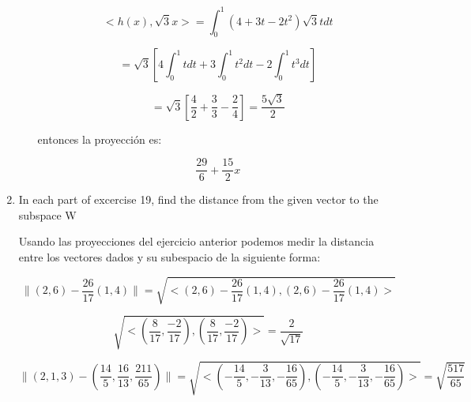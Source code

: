 \documentclass[12pt,a4paper]{article}
\providecommand{\norm}[1]{\lVert#1\rVert}
\begin{document}
\begin{enumerate}
\begin{enumerate}
        \begin{equation*}
            <h(x), \sqrt{3}x> = \int_{0}^{1} (4 +3t-2t^2)\sqrt{3}t dt 
        \end{equation*}
        
        \begin{equation*}
            = \sqrt{3} \left[ 4 \int_{0}^{1} t dt + 3 \int_{0}^{1} t^2 dt - 2 \int_{0}^{1} t^3 dt\right]
        \end{equation*}
        
        \begin{equation*}
            = \sqrt{3} \left[ \frac{4}{2} + \frac{3}{3} - \frac{2}{4}\right] = \frac{5 \sqrt{3}}{2}
        \end{equation*}
        
        entonces la proyección es:
        
        \begin{equation*}
            \frac{29}{6} + \frac{15}{2} x
        \end{equation*}
        
    \end{enumerate}

    
    
    
    
    
    
    \item In each part of excercise 19, find the distance from the given vector to the subspace W
    
    Usando las proyecciones del ejercicio anterior podemos medir la distancia entre los vectores dados y su subespacio de la siguiente forma:
    
    \begin{equation*}
        \norm{(2,6) - \frac{26}{17} (1,4)} =\sqrt{<(2,6) - \frac{26}{17}(1,4),(2,6) - \frac{26}{17}(1,4)>} 
    \end{equation*}
    
    \begin{equation*}
        \sqrt{<(\frac{8}{17}, \frac{-2}{17}),(\frac{8}{17}, \frac{-2}{17})>} =\frac{2}{\sqrt{17}}
    \end{equation*}
    
    \begin{equation*}
        \norm{(2,1,3) - (\frac{14}{5}, \frac{16}{13},\frac{211}{65})}= \sqrt{<(-\frac{14}{5},-\frac{3}{13}, -\frac{16}{65}),(-\frac{14}{5},-\frac{3}{13}, -\frac{16}{65})>} = \sqrt{\frac{517}{65}}
    \end{equation*}
    

\end{enumerate}
\end{document}
